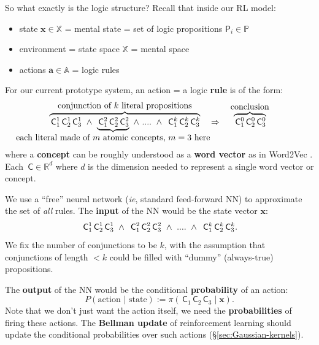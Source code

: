 \documentclass[orivec]{llncs}
\newcommand{\vect}[1]{\boldsymbol{#1}}
\begin{document}
So what exactly is the logic structure? Recall that inside our RL model:
\begin{itemize}
	\item state $\vect{x} \in \mathbb{X}$ = mental state = set of logic propositions $\mathsf{P}_i \in \mathbb{P}$
	\item environment = state space $\mathbb{X}$ = mental space
	\item actions $\vect{a} \in \mathbb{A}$ = logic rules
\end{itemize}

For our current prototype system, an action = a logic \textbf{rule} is of the form:
\newcommand{\Atom}{\,\mathsf{C}}
\renewcommand{\!}{\mkern6mu}
\begin{equation}
\label{eqn:logic-rule}
\overbrace{ \Atom^1_1 \Atom^1_2 \Atom^1_3 \! \wedge \! \underbrace{\Atom^2_1 \Atom^2_2 \Atom^2_3}_{\makebox[0pt]{each literal made of $m$ atomic concepts, $m = 3$ here}}  \! \wedge \! .... \! \wedge \! \Atom^k_1 \Atom^k_2 \Atom^k_3}^{\mbox{conjunction of $k$ literal propositions}} \quad \Rightarrow \quad \overbrace{ \Atom^0_1 \Atom^0_2 \Atom^0_3 }^{\mbox{conclusion}}
\end{equation}
where a \textbf{concept} can be roughly understood as a \textbf{word vector} as in Word2Vec \cite{Word2Vec}.  Each $\Atom \in \mathbb{R}^d$ where $d$ is the dimension needed to represent a single word vector or concept.

We use a ``free'' neural network (\textit{ie}, standard feed-forward NN) to approximate the set of \textit{all} rules.  The \textbf{input} of the NN would be the state vector $\vect{x}$:
\begin{equation}
\Atom^1_1 \Atom^1_2 \Atom^1_3 \! \wedge \! \Atom^2_1 \Atom^2_2 \Atom^2_3 \! \wedge \! .... \! \wedge \! \Atom^k_1 \Atom^k_2 \Atom^k_3 .
\end{equation}
We fix the number of conjunctions to be $k$, with the assumption that conjunctions of length $< k$ could be filled with ``dummy'' (always-true) propositions.

The \textbf{output} of the NN would be the conditional \textbf{probability} of an action:
\begin{equation}
P(\mbox{action } | \mbox{ state}) := \pi(\Atom_1 \Atom_2 \Atom_3 \; | \; \vect{x}).
\end{equation}
Note that we don't just want the action itself, we need the \textbf{probabilities} of firing these actions.  The \textbf{Bellman update} of reinforcement learning should update the conditional probabilities over such actions (\S\ref{sec:Gaussian-kernels}).
\end{document}
